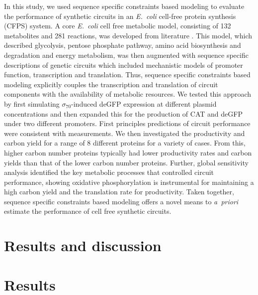 \documentclass[journal=asbcd6,manuscript=article]{achemso}
\begin{document}
In this study, we used sequence specific constraints based modeling to evaluate the performance of synthetic circuits in an \emph{E.~coli} cell-free protein synthesis (CFPS) system.
A core \emph{E.~coli} cell free metabolic model, consisting of 132 metabolites and 281 reactions, was developed from literature \cite{Feist:2007aa}.
This model, which described glycolysis, pentose phosphate pathway, amino acid biosynthesis and degradation and energy metabolism, was then augmented with
sequence specific descriptions of genetic circuits which included mechanistic models of promoter function, transcription and translation.
Thus, sequence specific constraints based modeling explicitly couples the transcription and translation of circuit components with the availability of metabolic resources.
We tested this approach by first simulating $\sigma_{70}$-induced deGFP expression at different plasmid concentrations and then expanded this for the production of CAT and deGFP under two different promoters.
First principles predictions of circuit performance were consistent with measurements.
We then investigated the productivity and carbon yield for a range of 8 different proteins for a variety of cases. 
From this, higher carbon number proteins typically had lower productivity rates and carbon yields than that of the lower carbon number proteins. 
Further, global sensitivity analysis identified the key metabolic processes that controlled circuit performance, showing oxidative phosphorylation is instrumental for maintaining a high carbon yield and the translation rate for productivity. 
Taken together, sequence specific constraints based modeling offers a novel means to \emph{a~priori} estimate the performance of cell free synthetic circuits.

\section{Results and discussion}


\section*{Results}
\end{document}
